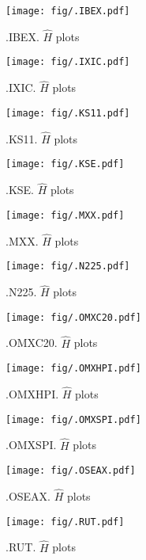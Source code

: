	\begin{figure}[h]
		\centering
		\texttt{[image: fig/.IBEX.pdf]}
		\caption{.IBEX. $\hat{H}$ plots}
	\end{figure}

	\begin{figure}[h]
		\centering
		\texttt{[image: fig/.IXIC.pdf]}
		\caption{.IXIC. $\hat{H}$ plots}
	\end{figure}

	\begin{figure}[h]
		\centering
		\texttt{[image: fig/.KS11.pdf]}
		\caption{.KS11. $\hat{H}$ plots}
	\end{figure}

	\begin{figure}[h]
		\centering
		\texttt{[image: fig/.KSE.pdf]}
		\caption{.KSE. $\hat{H}$ plots}
	\end{figure}

	\begin{figure}[h]
		\centering
		\texttt{[image: fig/.MXX.pdf]}
		\caption{.MXX. $\hat{H}$ plots}
	\end{figure}

	\begin{figure}[h]
		\centering
		\texttt{[image: fig/.N225.pdf]}
		\caption{.N225. $\hat{H}$ plots}
	\end{figure}

	\begin{figure}[h]
		\centering
		\texttt{[image: fig/.OMXC20.pdf]}
		\caption{.OMXC20. $\hat{H}$ plots}
	\end{figure}

	\begin{figure}[h]
		\centering
		\texttt{[image: fig/.OMXHPI.pdf]}
		\caption{.OMXHPI. $\hat{H}$ plots}
	\end{figure}

	\begin{figure}[h]
		\centering
		\texttt{[image: fig/.OMXSPI.pdf]}
		\caption{.OMXSPI. $\hat{H}$ plots}
	\end{figure}

	\begin{figure}[h]
		\centering
		\texttt{[image: fig/.OSEAX.pdf]}
		\caption{.OSEAX. $\hat{H}$ plots}
	\end{figure}

	\begin{figure}[h]
		\centering
		\texttt{[image: fig/.RUT.pdf]}
		\caption{.RUT. $\hat{H}$ plots}
	\end{figure}

